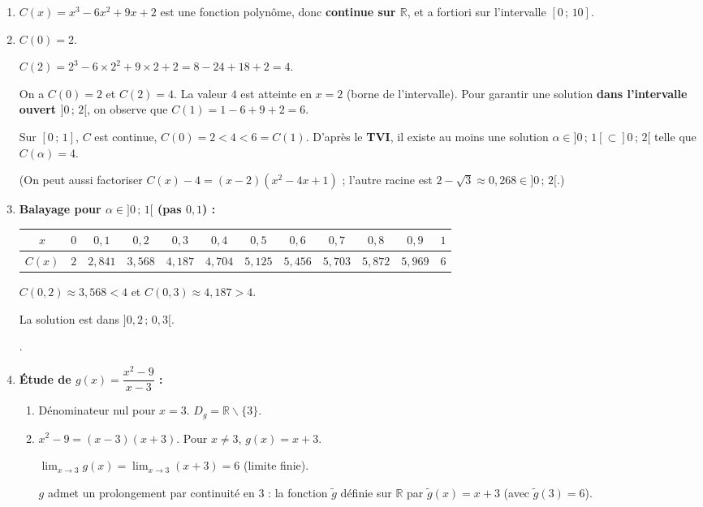 \documentclass[11pt]{article}
\def\setminus{\mathbin{\backslash}}\let\smallsetminus\setminus
\begin{document}
\begin{corrige}
\begin{enumerate}
\item $C(x) = x^3 - 6x^2 + 9x + 2$ est une fonction polynôme, donc \textbf{continue sur $\mathbb{R}$}, et a fortiori sur l'intervalle $[0\,;\,10]$.
\item $C(0) = 2$. \par
$C(2) = 2^3 - 6\times 2^2 + 9\times 2 + 2 = 8 - 24 + 18 + 2 = \boxed{4}$. \par
On a $C(0)=2$ et $C(2)=4$. La valeur $4$ est atteinte en $x=2$ (borne de l'intervalle). Pour garantir une solution \textbf{dans l'intervalle ouvert $]0\,;\,2[$}, on observe que $C(1) = 1 - 6 + 9 + 2 = 6$. \par
Sur $[0\,;\,1]$, $C$ est continue, $C(0)=2 < 4 < 6 = C(1)$. D'après le \textbf{TVI}, il existe au moins une solution $\alpha \in ]0\,;\,1[ \subset ]0\,;\,2[$ telle que $C(\alpha)=4$. \par
(On peut aussi factoriser $C(x)-4 = (x-2)(x^2-4x+1)$ ; l'autre racine est $2-\sqrt{3} \approx 0,268 \in ]0\,;\,2[$.)
\item \textbf{Balayage pour $\alpha \in ]0\,;\,1[$ (pas $0{,}1$) :}
\begin{center}
\begin{tabular}{|c|ccccccccccc|}\hline
$x$ & $0$ & $0,1$ & $0,2$ & $0,3$ & $0,4$ & $0,5$ & $0,6$ & $0,7$ & $0,8$ & $0,9$ & $1$ \\ \hline
$C(x)$ & $2$ & $2,841$ & $3,568$ & $4,187$ & $4,704$ & $5,125$ & $5,456$ & $5,703$ & $5,872$ & $5,969$ & $6$ \\ \hline
\end{tabular}
\end{center}
$C(0,2) \approx 3,568 < 4$ et $C(0,3) \approx 4,187 > 4$. \par
La solution est dans $]0,2\,;\,0,3[$. \par
{}.
\item \textbf{Étude de $g(x) = \dfrac{x^2 - 9}{x - 3}$ :}
\begin{enumerate}
\item Dénominateur nul pour $x=3$. $\boxed{D_g = \mathbb{R} \setminus \{3\}}$.
\item $x^2-9 = (x-3)(x+3)$. Pour $x \neq 3$, $g(x) = x+3$. \par
$\displaystyle\lim_{x \to 3} g(x) = \lim_{x \to 3} (x+3) = 6$ (limite finie). \par
$g$ admet un prolongement par continuité en $3$ : la fonction $\tilde{g}$ définie sur $\mathbb{R}$ par $\tilde{g}(x) = x+3$ (avec $\tilde{g}(3)=6$).

\end{enumerate}
\end{enumerate}
\end{corrige}
\end{document}
